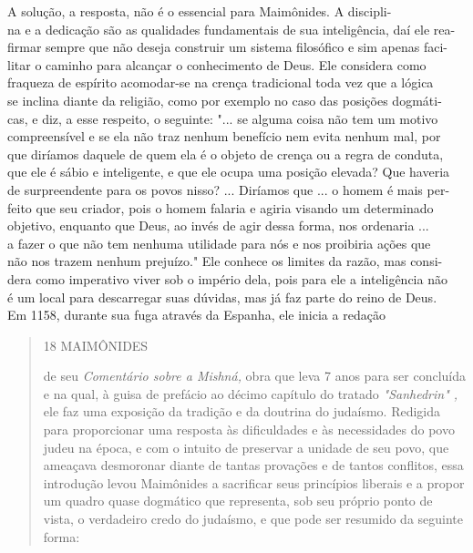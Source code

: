 A solução, a resposta, não é o essencial para Maimônides. A discipli-\\
na e a dedicação são as qualidades fundamentais de sua inteligência, daí
ele rea-\\
firmar sempre que não deseja construir um sistema filosófico e sim
apenas faci-\\
litar o caminho para alcançar o conhecimento de Deus. Ele considera
como\\
fraqueza de espírito acomodar-se na crença tradicional toda vez que a
lógica\\
se inclina diante da religião, como por exemplo no caso das posições
dogmáti-\\
cas, e diz, a esse respeito, o seguinte: "... se alguma coisa não tem um
motivo\\
compreensível e se ela não traz nenhum benefício nem evita nenhum mal,
por\\
que diríamos daquele de quem ela é o objeto de crença ou a regra de
conduta,\\
que ele é sábio e inteligente, e que ele ocupa uma posição elevada? Que
haveria\\
de surpreendente para os povos nisso? ... Diríamos que ... o homem é
mais per-\\
feito que seu criador, pois o homem falaria e agiria visando um
determinado\\
objetivo, enquanto que Deus, ao invés de agir dessa forma, nos ordenaria
...\\
a fazer o que não tem nenhuma utilidade para nós e nos proibiria ações
que\\
não nos trazem nenhum prejuízo." Ele conhece os limites da razão, mas
consi-\\
dera como imperativo viver sob o império dela, pois para ele a
inteligência não\\
é um local para descarregar suas dúvidas, mas já faz parte do reino de
Deus.\\
Em 1158, durante sua fuga através da Espanha, ele inicia a redação

\begin{quote}
18 MAIMÔNIDES

de seu \emph{Comentário sobre a Mishná,} obra que leva 7 anos para ser
concluída e na qual, à guisa de prefácio ao décimo capítulo do tratado
\emph{"Sanhedrin" ,} ele faz uma exposição da tradição e da doutrina do
judaísmo. Redigida para pro­porcionar uma resposta às dificuldades e às
necessidades do povo judeu na épo­ca, e com o intuito de preservar a
unidade de seu povo, que ameaçava desmo­ronar diante de tantas provações
e de tantos conflitos, essa introdução levou Maimônides a sacrificar
seus princípios liberais e a propor um quadro quase dogmático que
representa, sob seu próprio ponto de vista, o verdadeiro credo do
judaísmo, e que pode ser resumido da seguinte forma:
\end{quote}

